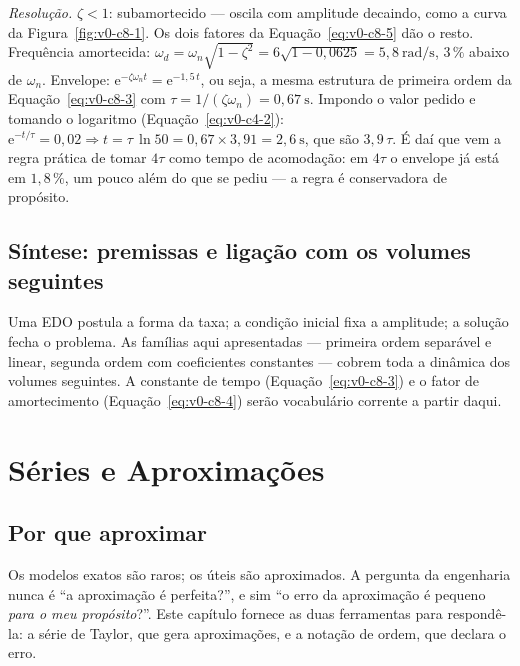 \documentclass[12pt,a4paper]{article}
\numberwithin{equation}{section}
\numberwithin{table}{section}
\numberwithin{figure}{section}
\begin{document}
\emph{Resolução.} $\zeta < 1$: subamortecido --- oscila com amplitude
decaindo, como a curva da Figura~\ref{fig:v0-c8-1}. Os dois fatores da
Equação~\eqref{eq:v0-c8-5} dão o resto. Frequência amortecida:
$\omega_d = \omega_n\sqrt{1 - \zeta^2} = 6\sqrt{1 - 0{,}0625} =
5{,}8\ \mathrm{rad/s}$, $3\,\%$ abaixo de $\omega_n$. Envelope:
$\mathrm{e}^{-\zeta\omega_n t} = \mathrm{e}^{-1{,}5\,t}$, ou seja, a
mesma estrutura de primeira ordem da Equação~\eqref{eq:v0-c8-3} com
$\tau = 1/(\zeta\omega_n) = 0{,}67\ \mathrm{s}$. Impondo o valor pedido
e tomando o logaritmo (Equação~\eqref{eq:v0-c4-2}):
$\mathrm{e}^{-t/\tau} = 0{,}02 \Rightarrow
t = \tau\,\ln 50 = 0{,}67 \times 3{,}91 = 2{,}6\ \mathrm{s}$, que são
$3{,}9\,\tau$. É daí que vem a regra prática de tomar $4\tau$ como tempo
de acomodação: em $4\tau$ o envelope já está em $1{,}8\,\%$, um pouco
além do que se pediu --- a regra é conservadora de propósito.

\subsection{Síntese: premissas e ligação com os volumes seguintes}

Uma EDO postula a forma da taxa; a condição inicial fixa a amplitude; a
solução fecha o problema. As famílias aqui apresentadas --- primeira ordem
separável e linear, segunda ordem com coeficientes constantes --- cobrem
toda a dinâmica dos volumes seguintes. A constante de tempo
(Equação~\eqref{eq:v0-c8-3}) e o fator de amortecimento
(Equação~\eqref{eq:v0-c8-4}) serão vocabulário corrente a partir daqui.


\clearpage
\section{Séries e Aproximações}\label{sec:v0-series}

\subsection{Por que aproximar}

Os modelos exatos são raros; os úteis são aproximados. A pergunta da
engenharia nunca é ``a aproximação é perfeita?'', e sim ``o erro da
aproximação é pequeno \emph{para o meu propósito}?''. Este capítulo fornece
as duas ferramentas para respondê-la: a série de Taylor, que gera
aproximações, e a notação de ordem, que declara o erro.
\end{document}
